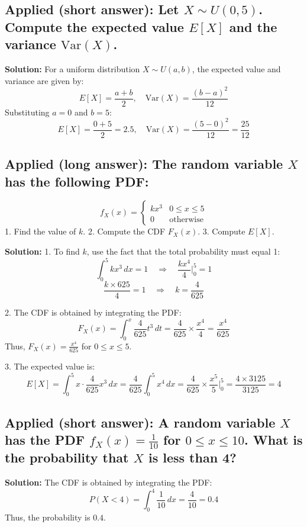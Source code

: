 \documentclass[12pt]{article}
\begin{document}
\subsection{Applied (short answer): Let \( X \sim U(0, 5) \). Compute the expected value \( E[X] \) and the variance \( \text{Var}(X) \).}

\textbf{Solution:}  
For a uniform distribution \( X \sim U(a, b) \), the expected value and variance are given by:
\[
E[X] = \frac{a + b}{2}, \quad \text{Var}(X) = \frac{(b - a)^2}{12}
\]
Substituting \( a = 0 \) and \( b = 5 \):
\[
E[X] = \frac{0 + 5}{2} = 2.5, \quad \text{Var}(X) = \frac{(5 - 0)^2}{12} = \frac{25}{12}
\]

\subsection{Applied (long answer): The random variable \( X \) has the following PDF:}
\[
f_X(x) = 
\begin{cases}
kx^3 & 0 \leq x \leq 5 \\
0 & \text{otherwise}
\end{cases}
\]
1. Find the value of \( k \).  
2. Compute the CDF \( F_X(x) \).  
3. Compute \( E[X] \).  

\textbf{Solution:}  
1. To find \( k \), use the fact that the total probability must equal 1:
\[
\int_0^5 kx^3 \, dx = 1 \quad \Rightarrow \quad \frac{kx^4}{4} \Bigg|_0^5 = 1
\]
\[
\frac{k \times 625}{4} = 1 \quad \Rightarrow \quad k = \frac{4}{625}
\]

2. The CDF is obtained by integrating the PDF:
\[
F_X(x) = \int_0^x \frac{4}{625} t^3 \, dt = \frac{4}{625} \times \frac{x^4}{4} = \frac{x^4}{625}
\]
Thus, \( F_X(x) = \frac{x^4}{625} \) for \( 0 \leq x \leq 5 \).

3. The expected value is:
\[
E[X] = \int_0^5 x \cdot \frac{4}{625} x^3 \, dx = \frac{4}{625} \int_0^5 x^4 \, dx = \frac{4}{625} \times \frac{x^5}{5} \Bigg|_0^5 = \frac{4 \times 3125}{3125} = 4
\]


\subsection{Applied (short answer): A random variable \( X \) has the PDF \( f_X(x) = \frac{1}{10} \) for \( 0 \leq x \leq 10 \). What is the probability that \( X \) is less than 4?}

\textbf{Solution:}  
The CDF is obtained by integrating the PDF:
\[
P(X < 4) = \int_0^4 \frac{1}{10} \, dx = \frac{4}{10} = 0.4
\]
Thus, the probability is \( 0.4 \).
\end{document}
